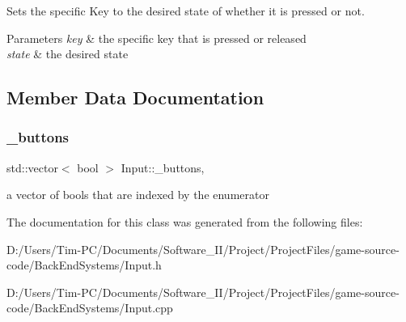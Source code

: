 Sets the specific Key to the desired state of whether it is pressed or not. 


\begin{DoxyParams}{Parameters}
{\em key} & the specific key that is pressed or released \\
\hline
{\em state} & the desired state \\
\hline
\end{DoxyParams}


\subsection{Member Data Documentation}
\mbox{\label{class_input_affef708e1d603d97a7218b64eab063b5}} 
\subsubsection{\texorpdfstring{\+\_\+buttons}{\_buttons}}
{\footnotesize\ttfamily std\+::vector$<$ bool $>$ Input\+::\+\_\+buttons\hspace{0.3cm}{\ttfamily [static]}, {\ttfamily [private]}}

a vector of bools that are indexed by the enumerator 

The documentation for this class was generated from the following files\+:\begin{DoxyCompactItemize}
\item 
D\+:/\+Users/\+Tim-\/\+P\+C/\+Documents/\+Software\+\_\+\+I\+I/\+Project/\+Project\+Files/game-\/source-\/code/\+Back\+End\+Systems/Input.\+h\item 
D\+:/\+Users/\+Tim-\/\+P\+C/\+Documents/\+Software\+\_\+\+I\+I/\+Project/\+Project\+Files/game-\/source-\/code/\+Back\+End\+Systems/Input.\+cpp\end{DoxyCompactItemize}
